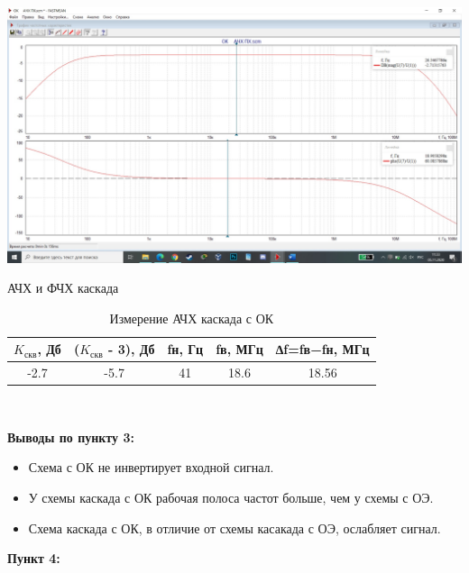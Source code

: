 \documentclass[a4paper,14pt]{extarticle}
\begin{document}
    \begin{center}
        \includegraphics[scale=0.25]{3.1.jpg}
    \end{center}
    \begin{center}
        АЧХ и ФЧХ каскада
    \end{center}

    \begin{table}[ht]
        \begin{center}
            \caption{Измерение АЧХ каскада с ОК}
            \begin{tabular}{ |c|c|c|c|c| }
                \hline
                $K_{\text{скв}}$, Дб & ($K_{\text{скв}}$ - 3), Дб&fн, Гц & fв, МГц & ∆f=fв−fн, МГц \\
                \hline 
                -2.7 & -5.7 & 41 & 18.6 & 18.56\\
                \hline
            \end{tabular}\\
        \end{center}
    \end{table}
    \textbf{Выводы по пункту 3:}
    \vspace{-6ex}
    \begin{singlespace}
        \begin{itemize}
            \item Схема с ОК не инвертирует входной сигнал.
            \item У схемы каскада с ОК рабочая полоса частот больше, чем у схемы с ОЭ.
            \item Схема каскада с ОК, в отличие от схемы касакада с ОЭ, ослабляет сигнал. 
        \end{itemize}
    \end{singlespace}


    \newpage
    \textbf{Пункт 4:}
\end{document}
